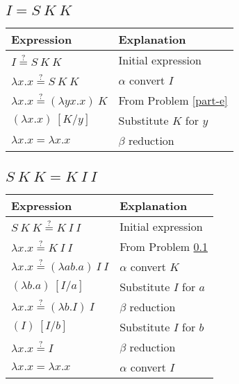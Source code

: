 \documentclass[letterpaper, 10pt, DIV=13]{scrartcl}
\numberwithin{equation}{section}
\numberwithin{figure}{section}
\numberwithin{table}{section}
\begin{document}
\subsection{$I = S~K~K$}\label{part-3a}
\begin{center}
\begin{tabularx}{\textwidth}{|Y|Y|}
    \hline
    Expression & Explanation \\
    \hline
    $I \stackrel{?}{=} S~K~K$ & Initial expression \\
    \hline
    $\lambda x.x \stackrel{?}{=} S~K~K$ & $\alpha$ convert $I$ \\
    \hline
    $\lambda x.x \stackrel{?}{=} (\lambda yx.x)~K$ & From Problem \ref{part-e} \\
    \hline
    $(\lambda x.x)~[K / y]$ & Substitute $K$ for $y$ \\
    \hline
    $\lambda x.x = \lambda x.x$ & $\beta$ reduction \\
    \hline
\end{tabularx}
\end{center}

\subsection{$S~K~K = K~I~I$}
\begin{center}
\begin{tabularx}{\textwidth}{|Y|Y|}
    \hline
    Expression & Explanation \\
    \hline
    $S~K~K \stackrel{?}{=} K~I~I$ & Initial expression \\
    \hline
    $\lambda x.x \stackrel{?}{=} K~I~I$ & From Problem \ref{part-3a} \\
    \hline
    $\lambda x.x \stackrel{?}{=} (\lambda ab.a)~I~I$ & $\alpha$ convert $K$ \\
    \hline
    $(\lambda b.a)~[I / a]$ & Substitute $I$ for $a$ \\
    \hline
    $\lambda x.x \stackrel{?}{=} (\lambda b.I)~I$ & $\beta$ reduction \\
    \hline
    $(I)~[I / b]$ & Substitute $I$ for $b$ \\
    \hline
    $\lambda x.x \stackrel{?}{=} I$ & $\beta$ reduction \\
    \hline
    $\lambda x.x = \lambda x.x$ & $\alpha$ convert $I$ \\
    \hline
\end{tabularx}
\end{center}
\end{document}
